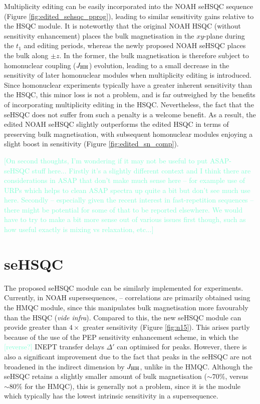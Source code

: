 \documentclass[11pt]{article}
\newcommand*{\proton}{\ce{^{1}H}}
\newcommand*{\nitrogen}{\ce{^{15}N}}
\newcommand*{\hl}[1]{\textcolor{Aquamarine}{[#1]}}
\newcommand*{\jhh}{J_{\ce{HH}}}
\newcommand*{\figref}[1]{Figure \ref{fig:#1}}
\begin{document}
Multiplicity editing can be easily incorporated into the NOAH seHSQC sequence (\figref{edited_sehsqc_pprog}), leading to similar sensitivity gains relative to the HSQC module.
It is noteworthy that the original NOAH HSQC (without sensitivity enhancement) places the bulk magnetisation in the $xy$-plane during the $t_1$ and editing periods, whereas the newly proposed NOAH seHSQC places the bulk along $\pm z$.
In the former, the bulk magnetisation is therefore subject to homonuclear coupling ($\jhh$) evolution, leading to a small decrease in the sensitivity of later homonuclear modules when multiplicity editing is introduced.
Since homonuclear experiments typically have a greater inherent sensitivity than the HSQC, this minor loss is not a problem, and is far outweighed by the benefits of incorporating multiplicity editing in the HSQC.
Nevertheless, the fact that the seHSQC does not suffer from such a penalty is a welcome benefit.
As a result, the edited NOAH seHSQC slightly outperforms the edited HSQC in terms of preserving bulk magnetisation, with subsequent homonuclear modules enjoying a slight boost in sensitivity (\figref{edited_sn_comp}).

\hl{On second thoughts, I'm wondering if it may not be useful to put ASAP-seHSQC stuff here...
    Firstly it's a slightly different context and I think there are considerations in ASAP that don't make much sense here -- for example use of URPs which helps to clean ASAP spectra up quite a bit but don't see much use here.
    Secondly -- especially given the recent interest in fast-repetition sequences -- there might be potential for some of that to be reported elsewhere.
    We would have to try to make a bit more sense out of various issues first though, such as how useful exactly is mixing vs relaxation, etc...}


\section*{\texorpdfstring{\nitrogen{}}{15N} seHSQC}

The proposed seHSQC module can be similarly implemented for \nitrogen{} experiments.
Currently, in NOAH supersequences, \nitrogen{}--\proton{} correlations are primarily obtained using the HMQC module, since this manipulates bulk magnetisation more favourably than the HSQC (\textit{vide infra}).\autocite{Kupce2007MRC, Kupce2017ACIE}
Compared to this, the new seHSQC module can provide greater than $4\times$ greater sensitivity (\figref{n15}).
This arises partly because of the use of the PEP sensitivity enhancement scheme, in which the \hl{reverse?} INEPT transfer delays $\Delta'$ can optimised for  peaks.
However, there is also a significant improvement due to the fact that peaks in the \nitrogen{} seHSQC are not broadened in the indirect dimension by $\jhh$, unlike in the HMQC.
Although the seHSQC retains a slightly smaller amount of bulk magnetisation ($\sim 70\%$, versus $\sim 80\%$ for the HMQC), this is generally not a problem, since it is the \nitrogen{} module which typically has the lowest intrinsic sensitivity in a supersequence.
\end{document}
